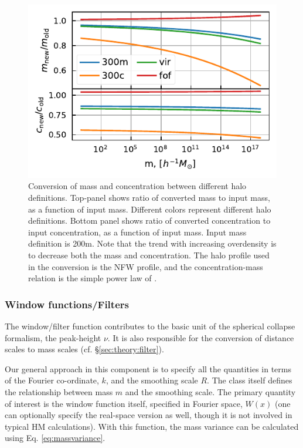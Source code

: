 \documentclass[5p,aas_macros]{elsarticle}
\begin{document}
\begin{figure}
  \centering
  \includegraphics[width=\linewidth]{figures/mass_conversion.pdf}
  \caption[Mass conversion]{Conversion of mass and concentration between different halo definitions. Top-panel shows ratio of converted mass to input mass, as a function of input mass. Different colors represent different halo definitions. Bottom panel shows ratio of converted
  concentration to input concentration, as a function of input mass.
  Input mass definition is 200m. Note that the trend with increasing overdensity is to decrease both the mass and concentration. 
  The halo profile used in the conversion is the NFW profile, and the concentration-mass relation is the simple power law of \cite{Duffy2008}.}
  \label{fig:mass_conversion}
\end{figure}

\subsubsection{Window functions/Filters}
\label{sec:halomod:components:window}
The window/filter function contributes to the basic unit of the spherical collapse formalism, the peak-height $\nu$. It is also responsible for the conversion of distance scales to mass scales (cf. \S\ref{sec:theory:filter}).

Our general approach in this component is to specify all the quantities in terms of the Fourier co-ordinate, $k$, and the smoothing scale $R$. The class itself defines the relationship between mass $m$ and the smoothing scale. The primary quantity of interest is the window function itself, specified in Fourier space, $W(x)$ (one can optionally specify the real-space version as well, though it is not involved in typical HM calculations). With this function, the mass variance can be calculated using Eq. \ref{eq:massvariance}. 
\end{document}
